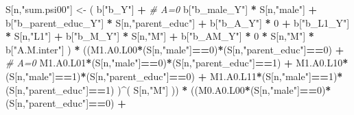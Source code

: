 \documentclass[
]{book}
\newenvironment{Shaded}{\begin{snugshade}}{\end{snugshade}}
\newcommand{\CommentTok}[1]{\textcolor[rgb]{0.56,0.35,0.01}{\textit{#1}}}
\newcommand{\DecValTok}[1]{\textcolor[rgb]{0.00,0.00,0.81}{#1}}
\newcommand{\NormalTok}[1]{#1}
\newcommand{\OtherTok}[1]{\textcolor[rgb]{0.56,0.35,0.01}{#1}}
\newcommand{\SpecialCharTok}[1]{\textcolor[rgb]{0.81,0.36,0.00}{\textbf{#1}}}
\newcommand{\StringTok}[1]{\textcolor[rgb]{0.31,0.60,0.02}{#1}}
\begin{document}
\begin{Shaded}
\begin{Highlighting}[]
\NormalTok{    S[n,}\StringTok{"sum.psi00"}\NormalTok{] }\OtherTok{\textless{}{-}}\NormalTok{  ( b[}\StringTok{"b\_Y"}\NormalTok{] }\SpecialCharTok{+}                                           \CommentTok{\# A=0}
\NormalTok{                             b[}\StringTok{"b\_male\_Y"}\NormalTok{] }\SpecialCharTok{*}\NormalTok{ S[n,}\StringTok{"male"}\NormalTok{] }\SpecialCharTok{+} 
\NormalTok{                             b[}\StringTok{"b\_parent\_educ\_Y"}\NormalTok{] }\SpecialCharTok{*}\NormalTok{ S[n,}\StringTok{"parent\_educ"}\NormalTok{] }\SpecialCharTok{+} 
\NormalTok{                             b[}\StringTok{"b\_A\_Y"}\NormalTok{] }\SpecialCharTok{*} \DecValTok{0} \SpecialCharTok{+} 
\NormalTok{                             b[}\StringTok{"b\_L1\_Y"}\NormalTok{] }\SpecialCharTok{*}\NormalTok{ S[n,}\StringTok{"L1"}\NormalTok{] }\SpecialCharTok{+}
\NormalTok{                             b[}\StringTok{"b\_M\_Y"}\NormalTok{] }\SpecialCharTok{*}\NormalTok{ S[n,}\StringTok{"M"}\NormalTok{] }\SpecialCharTok{+}
\NormalTok{                             b[}\StringTok{"b\_AM\_Y"}\NormalTok{] }\SpecialCharTok{*} \DecValTok{0} \SpecialCharTok{*}\NormalTok{ S[n,}\StringTok{"M"}\NormalTok{] }\SpecialCharTok{*}\NormalTok{ b[}\StringTok{"A.M.inter"}\NormalTok{] ) }\SpecialCharTok{*}
\NormalTok{      ((M1.A0.L00}\SpecialCharTok{*}\NormalTok{(S[n,}\StringTok{"male"}\NormalTok{]}\SpecialCharTok{==}\DecValTok{0}\NormalTok{)}\SpecialCharTok{*}\NormalTok{(S[n,}\StringTok{"parent\_educ"}\NormalTok{]}\SpecialCharTok{==}\DecValTok{0}\NormalTok{) }\SpecialCharTok{+}                    \CommentTok{\# A\textquotesingle{}=0}
\NormalTok{          M1.A0.L01}\SpecialCharTok{*}\NormalTok{(S[n,}\StringTok{"male"}\NormalTok{]}\SpecialCharTok{==}\DecValTok{0}\NormalTok{)}\SpecialCharTok{*}\NormalTok{(S[n,}\StringTok{"parent\_educ"}\NormalTok{]}\SpecialCharTok{==}\DecValTok{1}\NormalTok{) }\SpecialCharTok{+}
\NormalTok{          M1.A0.L10}\SpecialCharTok{*}\NormalTok{(S[n,}\StringTok{"male"}\NormalTok{]}\SpecialCharTok{==}\DecValTok{1}\NormalTok{)}\SpecialCharTok{*}\NormalTok{(S[n,}\StringTok{"parent\_educ"}\NormalTok{]}\SpecialCharTok{==}\DecValTok{0}\NormalTok{) }\SpecialCharTok{+} 
\NormalTok{          M1.A0.L11}\SpecialCharTok{*}\NormalTok{(S[n,}\StringTok{"male"}\NormalTok{]}\SpecialCharTok{==}\DecValTok{1}\NormalTok{)}\SpecialCharTok{*}\NormalTok{(S[n,}\StringTok{"parent\_educ"}\NormalTok{]}\SpecialCharTok{==}\DecValTok{1}\NormalTok{) )}\SpecialCharTok{\^{}}\NormalTok{( S[n,}\StringTok{"M"}\NormalTok{] )) }\SpecialCharTok{*}
\NormalTok{      ((M0.A0.L00}\SpecialCharTok{*}\NormalTok{(S[n,}\StringTok{"male"}\NormalTok{]}\SpecialCharTok{==}\DecValTok{0}\NormalTok{)}\SpecialCharTok{*}\NormalTok{(S[n,}\StringTok{"parent\_educ"}\NormalTok{]}\SpecialCharTok{==}\DecValTok{0}\NormalTok{) }\SpecialCharTok{+}                

\end{Highlighting}
\end{Shaded}
\end{document}
